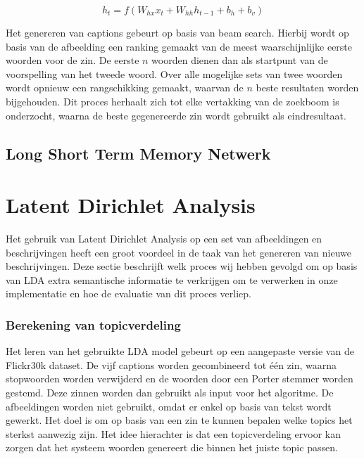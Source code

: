 \begin{equation}
     h_t = f(W_{hx} x_{t} + W_{hh} h_{t-1} + b_h + b_v)
\label{eq:rnnfeedalways}
\end{equation}

Het genereren van captions gebeurt op basis van beam search. Hierbij wordt op basis van de afbeelding een ranking gemaakt van de meest waarschijnlijke eerste woorden voor de zin. De eerste $n$ woorden dienen dan als startpunt van de voorspelling van het tweede woord. Over alle mogelijke sets van twee woorden wordt opnieuw een rangschikking gemaakt, waarvan de $n$ beste resultaten worden bijgehouden. Dit proces herhaalt zich tot elke vertakking van de zoekboom is onderzocht, waarna de beste gegenereerde zin wordt gebruikt als eindresultaat.

\subsection{Long Short Term Memory Netwerk}

\section{Latent Dirichlet Analysis}
Het gebruik van Latent Dirichlet Analysis op een set van afbeeldingen en beschrijvingen heeft een groot voordeel in de taak van het genereren van nieuwe beschrijvingen. Deze sectie beschrijft welk proces wij hebben gevolgd om op basis van LDA extra semantische informatie te verkrijgen om te verwerken in onze implementatie en hoe de evaluatie van dit proces verliep.

\subsubsection{Berekening van topicverdeling}
\label{subs:Berekening van topicverdeling}
Het leren van het gebruikte LDA model gebeurt op een aangepaste versie van de Flickr30k dataset. De vijf captions worden gecombineerd tot \'e\'en zin, waarna stopwoorden worden verwijderd en de woorden door een Porter stemmer worden gestemd. Deze zinnen worden dan gebruikt als input voor het algoritme. De afbeeldingen worden niet gebruikt, omdat er enkel op basis van tekst wordt gewerkt. Het doel is om op basis van een zin te kunnen bepalen welke topics het sterkst aanwezig zijn. Het idee hierachter is dat een topicverdeling ervoor kan zorgen dat het systeem woorden genereert die binnen het juiste topic passen.

